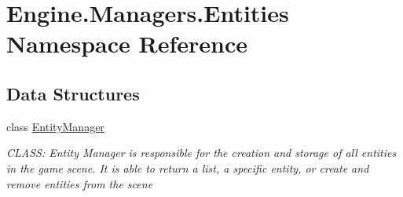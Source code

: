 \hypertarget{a00269}{}\section{Engine.\+Managers.\+Entities Namespace Reference}
\label{a00269}
\subsection*{Data Structures}
\begin{DoxyCompactItemize}
\item 
class \hyperlink{a00518}{Entity\+Manager}
\begin{DoxyCompactList}\small\item\em C\+L\+A\+SS\+: Entity Manager is responsible for the creation and storage of all entities in the game scene. It is able to return a list, a specific entity, or create and remove entities from the scene \end{DoxyCompactList}\end{DoxyCompactItemize}

